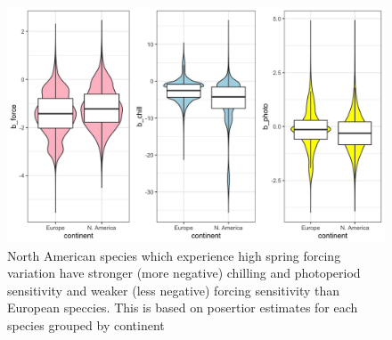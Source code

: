 \documentclass[11pt]{article}\usepackage[]{graphicx}\usepackage[]{color}
\begin{document}
\begin{figure}[h!]
    \centering
 \includegraphics[width=\textwidth]{..//figures/continental_cues.jpeg} 
    \caption{North American species which experience high spring forcing variation have stronger (more negative) chilling and photoperiod sensitivity and weaker (less negative) forcing sensitivity than European speccies. This is based on posertior estimates for each species grouped by continent}
    \label{fig:conts}
\end{figure}
\end{document}
